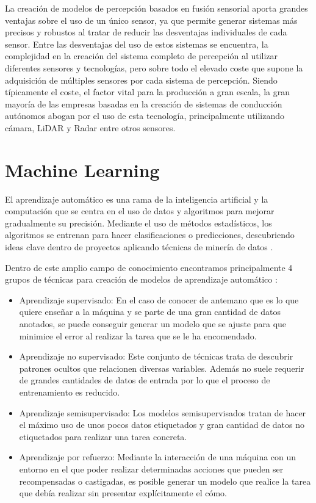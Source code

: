 La creación de modelos de percepción basados en fusión sensorial aporta grandes ventajas sobre el uso de un único sensor, ya que permite generar sistemas más precisos y robustos al tratar de reducir las desventajas individuales de cada sensor. Entre las desventajas del uso de estos sistemas se encuentra, la complejidad en la creación del sistema completo de percepción al utilizar diferentes sensores y tecnologías, pero sobre todo el elevado coste que supone la adquisición de múltiples sensores por cada sistema de percepción. Siendo típicamente el coste, el factor vital para la producción a gran escala, la gran mayoría de las empresas basadas en la creación de sistemas de conducción autónomos abogan por el uso de esta tecnología, principalmente utilizando cámara, \ac{LiDAR} y \ac{Radar} entre otros sensores.

\section{Machine Learning}
\label{sec:Machine Learning}

El aprendizaje automático es una rama de la inteligencia artificial y la computación que se centra en el uso de datos y algoritmos para mejorar gradualmente su precisión. Mediante el uso de métodos estadísticos, los algoritmos se entrenan para hacer clasificaciones o predicciones, descubriendo ideas clave dentro de proyectos aplicando técnicas de minería de datos \cite{what_ml}.

Dentro de este amplio campo de conocimiento encontramos principalmente 4 grupos de técnicas para creación de modelos de aprendizaje automático \cite{ml_techs}:

\begin{itemize}
    \item Aprendizaje supervisado: En el caso de conocer de antemano que es lo que quiere enseñar a la máquina y se parte de una gran cantidad de datos anotados, se puede conseguir generar un modelo que se ajuste para que minimice el error al realizar la tarea que se le ha encomendado.
    \item Aprendizaje no supervisado: Este conjunto de técnicas trata de descubrir patrones ocultos que relacionen diversas variables. Además no suele requerir de grandes cantidades de datos de entrada por lo que el proceso de entrenamiento es reducido.
    \item Aprendizaje semisupervisado: Los modelos semisupervisados tratan de hacer el máximo uso de unos pocos datos etiquetados y gran cantidad de datos no etiquetados para realizar una tarea concreta.
    \item Aprendizaje por refuerzo: Mediante la interacción de una máquina con un entorno en el que poder realizar determinadas acciones que pueden ser recompensadas o castigadas, es posible generar un modelo que realice la tarea que debía realizar sin presentar explícitamente el cómo.
\end{itemize}

